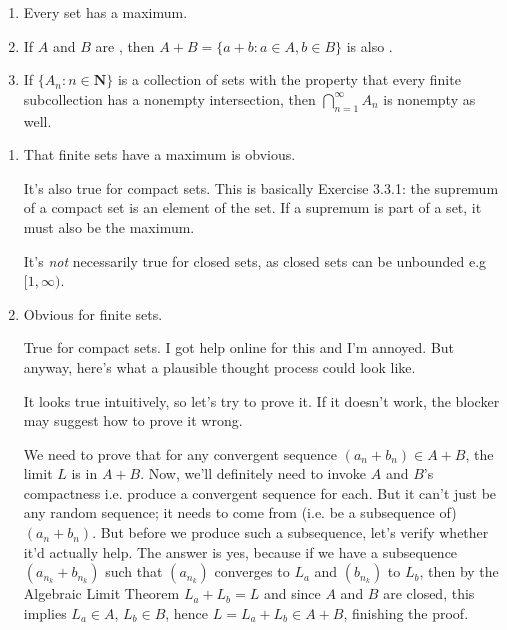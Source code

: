 \documentclass{oxmathproblems}
\begin{document}
\begin{questions}
\begin{enumerate}[label=(\alph*)]
  \item Every \underline{\phantom{blank}} set has a maximum.
  \item If $A$ and $B$ are \underline{\phantom{blank}}, then $A + B = \{a + b: a \in A, b \in B\}$ is also \underline{\phantom{blank}}.
  \item If $\{A_{n} : n \in \textbf{N}\}$ is a collection of \underline{\phantom{blank}} sets with the property that every finite subcollection has a nonempty intersection, then
  $\bigcap_{n=1}^{\infty} A_{n}$ is nonempty as well.
\end{enumerate}

\begin{solution}
  \begin{enumerate}[label=(\alph*)]
    \item That finite sets have a maximum is obvious.
    
    It's also true for compact sets. This is basically Exercise 3.3.1: the supremum of a compact set is an element of the set.
    If a supremum is part of a set, it must also be the maximum.

    It's \textit{not} necessarily true for closed sets, as closed sets can be unbounded e.g $[1, \infty)$.

    \item Obvious for finite sets.
    
    True for compact sets. I got help online for this and I'm annoyed. But anyway, here's what a plausible thought process could look like.

    It looks true intuitively, so let's try to prove it. If it doesn't work, the blocker may suggest how to prove it wrong.

    We need to prove that for any convergent sequence $(a_{n}+b_{n}) \in A+B$, the limit $L$ is in $A+B$. Now, we'll definitely need to invoke
    $A$ and $B$'s compactness i.e. produce a convergent sequence for each. But it can't just be any random sequence; it needs to come from (i.e.
    be a subsequence of) $(a_{n}+b_{n})$. But before we produce such a subsequence, let's verify whether it'd actually help. The answer is yes,
    because if we have a subsequence $(a_{n_{k}} + b_{n_{k}})$ such that $(a_{n_{k}})$ converges to $L_{a}$ and $(b_{n_{k}})$ to $L_{b}$, then by
    the Algebraic Limit Theorem $L_{a} + L_{b} = L$ and since $A$ and $B$ are closed, this implies $L_{a} \in A$, $L_{b} \in B$, hence $L = L_{a}+L_{b} \in A+B$,
    finishing the proof.  


\end{enumerate}
\end{solution}
\end{questions}
\end{document}
